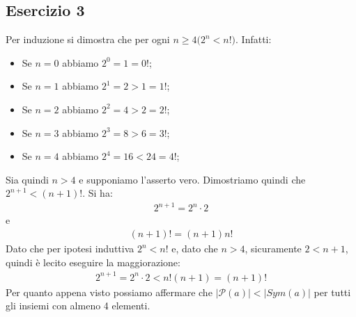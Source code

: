 \subsection*{Esercizio 3}
Per induzione si dimostra che per ogni $n \geq 4 \bigl( 2^{n} < n! \bigr)$. Infatti:
\begin{itemize}
	\item Se $n=0$ abbiamo $2^{0}=1 = 0!$;
	\item Se $n=1$ abbiamo $2^{1} = 2 > 1 = 1!$;
	\item Se $n=2$ abbiamo $2^{2} = 4 > 2 = 2!$;
	\item Se $n=3$ abbiamo $2^{3} = 8 > 6 = 3!$;
	\item Se $n=4$ abbiamo $2^{4} = 16 < 24 = 4!$;
\end{itemize}
Sia quindi $n>4$ e supponiamo l'asserto vero. Dimostriamo quindi che $2^{n+1}<(n+1)!$. Si ha:
\begin{align*}
	2^{n+1} = 2^{n} \cdot 2
\end{align*}
e 
\begin{align*}
	(n+1)! = (n+1)n!
\end{align*}
Dato che per ipotesi induttiva $2^{n}<n!$ e, dato che $n>4$, sicuramente $2 < n+1$, quindi è lecito eseguire la maggiorazione:
\begin{align*}
	2^{n+1} = 2^{n} \cdot 2 < n! (n+1) = (n+1)!
\end{align*}
Per quanto appena visto possiamo affermare che $|\mathcal{P}(a)| < |Sym(a)|$ per tutti gli insiemi con almeno 4 elementi.
